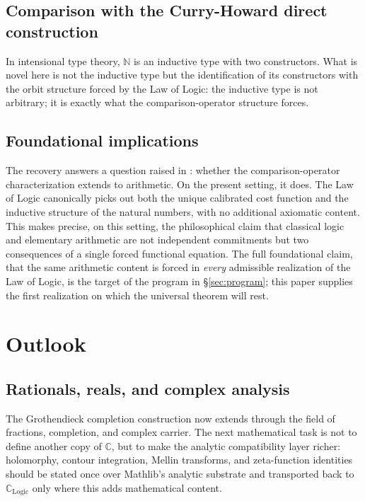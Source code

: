 \documentclass[11pt,a4paper]{article}
\theoremstyle{definition}
\theoremstyle{remark}
\begin{document}
\subsection{Comparison with the Curry-Howard direct construction}

In intensional type theory, $\mathbb{N}$ is an inductive type with two
constructors. What is novel here is not the inductive type but
the identification of its constructors with the orbit structure
forced by the Law of Logic: the inductive type is not arbitrary; it
is exactly what the comparison-operator structure forces.

\subsection{Foundational implications}

The recovery answers a question raised in \cite{Washburn2026LogicFE}:
whether the comparison-operator characterization extends to arithmetic.
On the present setting, it does. The Law of Logic canonically picks out
both the unique calibrated cost function and the inductive structure of
the natural numbers, with no additional axiomatic content. This makes
precise, on this setting, the philosophical claim that classical logic
and elementary arithmetic are not independent commitments but two
consequences of a single forced functional equation. The full
foundational claim, that the same arithmetic content is forced in
\emph{every} admissible realization of the Law of Logic, is the target
of the program in \S\ref{sec:program}; this paper supplies the first
realization on which the universal theorem will rest.

\section{Outlook}

\subsection{Rationals, reals, and complex analysis}

The Grothendieck completion construction now extends through the field
of fractions, completion, and complex carrier. The next mathematical
task is not to define another copy of $\mathbb{C}$, but to make the
analytic compatibility layer richer: holomorphy, contour integration,
Mellin transforms, and zeta-function identities should be stated once
over Mathlib's analytic substrate and transported back to
$\mathbb{C}_{\mathrm{Logic}}$ only where this adds mathematical content.
\end{document}
